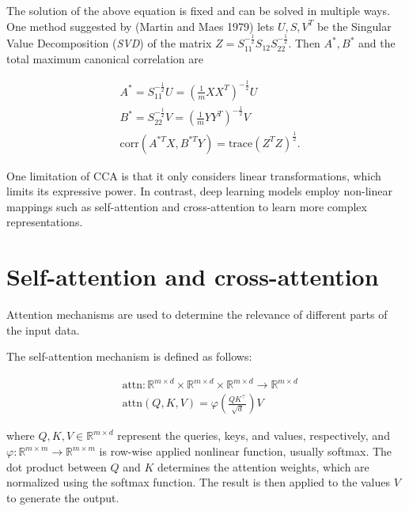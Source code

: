 \documentclass[a4paper,14pt]{article}
\newcommand{\dR}{\mathbb{R}}
\theoremstyle{plain} %
\theoremstyle{definition} %
\theoremstyle{remark} %
\begin{document}
	The solution of the above equation is fixed and can be solved in multiple ways. One method suggested by (Martin and Maes 1979) lets $U, S, V^T$ be the Singular Value Decomposition (\textit{SVD}) of the matrix $Z = S_{11}^{- \frac{1}{2}} S_{12} S_{22}^{- \frac{1}{2}}$. Then $A^*, B^*$ and the total maximum canonical correlation are 
	
	\begin{equation}
		\begin{aligned}
			&A^* = S_{11}^{-\frac{1}{2}} U = \left( \frac{1}{m} X X^T \right)^{-\frac{1}{2}} U \\
			&B^* = S_{22}^{-\frac{1}{2}} V = \left( \frac{1}{m} Y Y^T \right)^{-\frac{1}{2}} V \\
			&\text{corr}(A^{*T} X, B^{*T} Y) = \text{trace}(Z^T Z)^{\frac{1}{2}}.
		\end{aligned}
		\label{cca:solution}
	\end{equation}
	
	One limitation of CCA is that it only considers linear transformations, which limits its expressive power. In contrast, deep learning models employ non-linear mappings such as self-attention and cross-attention to learn more complex representations.
	
	\section*{Self-attention and cross-attention}
	
	Attention mechanisms are used to determine the relevance of different parts of the input data.
	
	The self-attention mechanism is defined as follows:
	
	\begin{equation}
		\begin{aligned}
			&\text{attn}: \mathbb{R}^{m \times d} \times \mathbb{R}^{m \times d} \times \mathbb{R}^{m \times d} \longrightarrow \mathbb{R}^{m \times d} \\
			&\text{attn}(Q, K, V) = \varphi\left(\frac{Q K^\top}{\sqrt{d}}\right) V
		\end{aligned}
		\label{attn}
	\end{equation}
	
	where $Q, K, V \in \dR^{m \times d}$ represent the queries, keys, and values, respectively, and $\varphi: \dR^{m \times m} \longrightarrow \dR^{m \times m}$ is row-wise applied nonlinear function, usually softmax. The dot product between $Q$ and $K$ determines the attention weights, which are normalized using the softmax function. The result is then applied to the values $V$ to generate the output.
	
\end{document}
